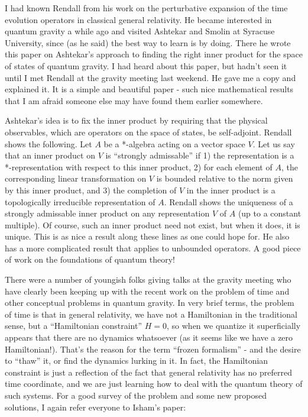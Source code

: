 \documentclass{article}
\def\tightlist{}
\renewcommand{\texttt}[1]{%
  \begingroup
  \ttfamily
  \begingroup\lccode`~=`/\lowercase{\endgroup\def~}{/\discretionary{}{}{}}%
  \begingroup\lccode`~=`[\lowercase{\endgroup\def~}{[\discretionary{}{}{}}%
  \begingroup\lccode`~=`.\lowercase{\endgroup\def~}{.\discretionary{}{}{}}%
  \catcode`/=\active\catcode`[=\active\catcode`.=\active
  \scantokens{#1\noexpand}%
  \endgroup
}
\begin{document}
I had known Rendall from his work on the perturbative expansion of the
time evolution operators in classical general relativity. He became
interested in quantum gravity a while ago and visited Ashtekar and
Smolin at Syracuse University, since (as he said) the best way to learn
is by doing. There he wrote this paper on Ashtekar's approach to finding
the right inner product for the space of states of quantum gravity. I
had heard about this paper, but hadn't seen it until I met Rendall at
the gravity meeting last weekend. He gave me a copy and explained it. It
is a simple and beautiful paper - such nice mathematical results that I
am afraid someone else may have found them earlier somewhere.

Ashtekar's idea is to fix the inner product by requiring that the
physical observables, which are operators on the space of states, be
self-adjoint. Rendall shows the following. Let \(A\) be a *-algebra
acting on a vector space \(V\). Let us say that an inner product on
\(V\) is ``strongly admissable'' if 1) the representation is a
*-representation with respect to this inner product, 2) for each element
of \(A\), the corresponding linear transformation on \(V\) is bounded
relative to the norm given by this inner product, and 3) the completion
of \(V\) in the inner product is a topologically irreducible
representation of \(A\). Rendall shows the uniqueness of a strongly
admissable inner product on any representation \(V\) of \(A\) (up to a
constant multiple). Of course, such an inner product need not exist, but
when it does, it is unique. This is as nice a result along these lines
as one could hope for. He also has a more complicated result that
applies to unbounded operators. A good piece of work on the foundations
of quantum theory!


There were a number of youngish folks giving talks at the gravity
meeting who have clearly been keeping up with the recent work on the
problem of time and other conceptual problems in quantum gravity. In
very brief terms, the problem of time is that in general relativity, we
have not a Hamiltonian in the traditional sense, but a ``Hamiltonian
constraint'' \(H = 0\), so when we quantize it superficially appears
that there are no dynamics whatsoever (as it seems like we have a zero
Hamiltonian!). That's the reason for the term ``frozen formalism'' - and
the desire to ``thaw'' it, or find the dynamics lurking in it. In fact,
the Hamiltonian constraint is just a reflection of the fact that general
relativity has no preferred time coordinate, and we are just learning
how to deal with the quantum theory of such systems. For a good survey
of the problem and some new proposed solutions, I again refer everyone
to Isham's paper:
\end{document}
